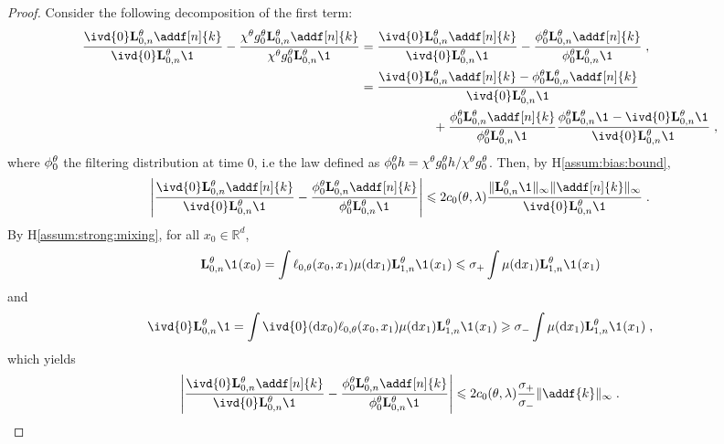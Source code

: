 \documentclass{article}
\begin{document}
\begin{proof}
Consider the following decomposition of the first term:
\begin{align*}
\frac{\ivd{0} \uk{0, n}{\parvec} \addf[n]{k}}{\ivd{0} \uk{0, n}{\parvec} \1_{}} - \frac{\chi^\parvec \md{0}{\parvec}\uk{0, n}{\parvec} \addf[n]{k}}{\chi^\parvec\md{0}{\parvec}\uk{0, n}{\parvec} \1_{}} &= \frac{\ivd{0} \uk{0, n}{\parvec} \addf[n]{k}}{\ivd{0} \uk{0, n}{\parvec} \1_{}} - \frac{\phi^\parvec_0\uk{0, n}{\parvec} \addf[n]{k}}{\phi^\parvec_0\uk{0, n}{\parvec} \1_{}}\eqsp,\\
& = \frac{\ivd{0} \uk{0, n}{\parvec} \addf[n]{k}-\phi^\parvec_0\uk{0, n}{\parvec} \addf[n]{k}}{\ivd{0} \uk{0, n}{\parvec} \1_{}} \\
&\hspace{2cm}+  \frac{\phi^\parvec_0\uk{0, n}{\parvec} \addf[n]{k}}{\phi^\parvec_0\uk{0, n}{\parvec} \1_{}}\frac{\phi^\parvec_0\uk{0, n}{\parvec} \1_{} - \ivd{0} \uk{0, n}{\parvec} \1_{}}{\ivd{0} \uk{0, n}{\parvec} \1_{}} \eqsp,
\end{align*}
where $\phi^\theta_0$ the filtering distribution at time $0$, i.e the law defined as  $\phi^\theta_0h= \chi^\theta g_{0}^{\theta}h/\chi^\theta g_{0}^{\theta}$. Then, by H\ref{assum:bias:bound},
$$
\left|\frac{\ivd{0} \uk{0, n}{\parvec} \addf[n]{k}}{\ivd{0} \uk{0, n}{\parvec} \1_{}} - \frac{\phi^\parvec_0\uk{0, n}{\parvec} \addf[n]{k}}{\phi^\parvec_0\uk{0, n}{\parvec} \1_{}}\right|\leqslant 2c_0(\parvec,\parvar)\frac{\| \uk{0, n}{\parvec} \1_{}\|_\infty\|\addf[n]{k}\|_\infty}{\ivd{0} \uk{0, n}{\parvec} \1_{}}\eqsp.
$$
By H\ref{assum:strong:mixing}, for all $x_0\in \mathbb{R}^d$,
$$
\uk{0, n}{\parvec} \1_{}(x_0) = \int  \ud{0,\parvec}(x_0, x_{1})\mu(\rmd x_1)\uk{1, n}{\parvec} \1_{}(x_1)\leqslant \sigma_+  \int \mu(\rmd x_1)\uk{1, n}{\parvec} \1_{}(x_1)
$$
and 
$$
\ivd{0} \uk{0, n}{\parvec} \1 = \int \ivd{0} (\rmd x_0)\ud{0,\parvec}(x_0, x_{1})\mu(\rmd x_1)\uk{1, n}{\parvec} \1_{}(x_1)\geqslant \sigma_-  \int \mu(\rmd x_1)\uk{1, n}{\parvec} \1_{}(x_1)\eqsp,
$$
which yields
$$
\left|\frac{\ivd{0} \uk{0, n}{\parvec} \addf[n]{k}}{\ivd{0} \uk{0, n}{\parvec} \1_{}} - \frac{\phi^\parvec_0\uk{0, n}{\parvec} \addf[n]{k}}{\phi^\parvec_0\uk{0, n}{\parvec} \1_{}}\right|\leqslant 2c_0(\parvec,\parvar)\frac{\sigma_+}{\sigma_-}\|\addf{k}\|_\infty\eqsp.
$$
\end{proof}
\end{document}
